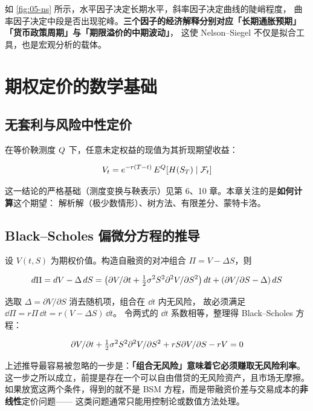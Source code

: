 如 \cref{fig:05-ns} 所示，水平因子决定长期水平，斜率因子决定曲线的陡峭程度，
曲率因子决定中段是否出现驼峰。\textbf{三个因子的经济解释分别对应「长期通胀预期」「货币政策周期」与「期限溢价的中期波动」}，
这使 Nelson--Siegel 不仅是拟合工具，也是宏观分析的载体。

\section{期权定价的数学基础}

\subsection{无套利与风险中性定价}

在等价鞅测度 $Q$ 下，任意未定权益的现值为其折现期望收益：

\begin{equation}
  V_t = e^{-r(T-t)}\,E^{Q}\!\left[H(S_T)\mid\mathcal{F}_t\right]
  \label{eq:05-rn}
\end{equation}

这一结论的严格基础（测度变换与鞅表示）见第 6、10 章。本章关注的是\textbf{如何计算}这个期望：
解析解（极少数情形）、树方法、有限差分、蒙特卡洛。

\subsection{Black--Scholes 偏微分方程的推导}

设 $V(t,S)$ 为期权价值。构造自融资的对冲组合 $\Pi = V - \Delta S$，则

\begin{equation}
  d\Pi = d V - \Delta\,d S
  = \left(\partial V/\partial t + \tfrac12\sigma^2S^2\partial^2 V/\partial S^2\right)d t
    + \left(\partial V/\partial S-\Delta\right)d S
  \label{eq:05-hedge}
\end{equation}

选取 $\Delta = \partial V/\partial S$ 消去随机项，组合在 $\dd t$ 内无风险，
故必须满足 $\dd\Pi = r\Pi\,\dd t = r(V - \Delta S)\,\dd t$。
令两式的 $\dd t$ 系数相等，整理得 Black--Scholes 方程：

\begin{equation}
  \partial V/\partial t + \tfrac12\sigma^2S^2\partial^2 V/\partial S^2 + rS\partial V/\partial S - rV = 0
  \label{eq:05-bspde}
\end{equation}

\begin{notebox}[推导中真正的关键一步]
上述推导最容易被忽略的一步是：\textbf{「组合无风险」意味着它必须赚取无风险利率}。
这一步之所以成立，前提是存在一个可以自由借贷的无风险资产，且市场无摩擦。
如果放宽这两个条件，得到的就不是 BSM 方程，而是带融资价差与交易成本的\textbf{非线性}定价问题——
这类问题通常只能用控制论或数值方法处理。
\end{notebox}

